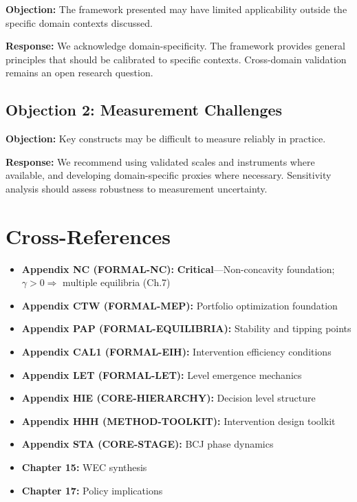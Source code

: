 \textbf{Objection:} The framework presented may have limited applicability
outside the specific domain contexts discussed.

\textbf{Response:} We acknowledge domain-specificity. The framework provides
general principles that should be calibrated to specific contexts. Cross-domain
validation remains an open research question.

\subsection{Objection 2: Measurement Challenges}

\textbf{Objection:} Key constructs may be difficult to measure reliably in
practice.

\textbf{Response:} We recommend using validated scales and instruments where
available, and developing domain-specific proxies where necessary. Sensitivity
analysis should assess robustness to measurement uncertainty.


\section{Cross-References}

\nocite{bcm_master}

\label{sec:meq-crossref}

\begin{itemize}[nosep]
    \item \textbf{Appendix NC (FORMAL-NC):} \textbf{Critical}---Non-concavity foundation; $\gamma > 0 \Rightarrow$ multiple equilibria (Ch.7)
    \item \textbf{Appendix CTW (FORMAL-MEP):} Portfolio optimization foundation
    \item \textbf{Appendix PAP (FORMAL-EQUILIBRIA):} Stability and tipping points
    \item \textbf{Appendix CAL1 (FORMAL-EIH):} Intervention efficiency conditions
    \item \textbf{Appendix LET (FORMAL-LET):} Level emergence mechanics
    \item \textbf{Appendix HIE (CORE-HIERARCHY):} Decision level structure
    \item \textbf{Appendix HHH (METHOD-TOOLKIT):} Intervention design toolkit
    \item \textbf{Appendix STA (CORE-STAGE):} BCJ phase dynamics
    \item \textbf{Chapter 15:} WEC synthesis
    \item \textbf{Chapter 17:} Policy implications
\end{itemize}

